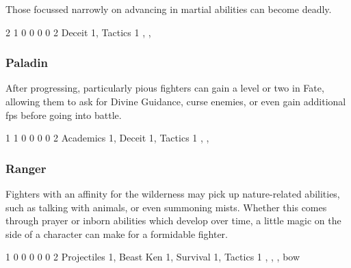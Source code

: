 {\begin{multicols}{2}
Those focussed narrowly on advancing in martial abilities can become deadly.


{2}%
{1}%
{{0}%
{0}%
{0}}%
{0}%
{2}%
{Deceit 1, Tactics 1\knacks{\adrenalinesurge, \charge, \firststrike}}%
{\longsword, \partialchain, \bucklar}%
{\addtocounter{fp}{5}}

\subsubsection{Paladin}

After progressing, particularly pious fighters can gain a level or two in Fate, allowing them to ask for Divine Guidance, curse enemies, or even gain additional \glspl{fp} before going into battle.


{1}%
{1}%
{{0}%
{0}%
{0}}%
{0}%
{2}%
{Academics 1, Deceit 1, Tactics 1\knacks{\adrenalinesurge, \finishingblow}}%
{\longsword, \partialchain, \bucklar}%
{\addtocounter{fp}{10}}

\subsubsection{Ranger}

Fighters with an affinity for the wilderness may pick up nature-related abilities, such as talking with animals, or even summoning mists.
Whether this comes through prayer or inborn abilities which develop over time, a little magic on the side of a character can make for a formidable fighter.


{1}%
{0}%
{{0}%
{0}%
{0}}%
{0}%
{2}%
{Projectiles 1, Beast Ken 1, Survival 1, Tactics 1\knacks{\mightydraw, \charge}}%
{\longsword, \partialchain, \bucklar, bow}%
{\addtocounter{fp}{10}}

\end{multicols}

}{}
